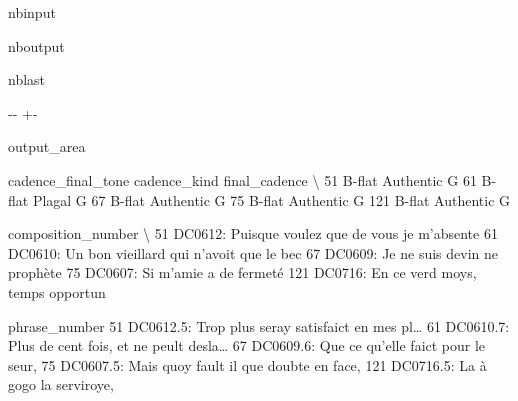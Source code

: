 \documentclass[letterpaper,10pt,english]{sphinxmanual}
\newlength\nbsphinxcodecellspacing
\begin{document}
\begin{sphinxuseclass}{nbinput}
{\begin{sphinxVerbatim}[commandchars=\\\{\}]

  \PYG{p}{[}\PYG{p}{]}


\end{sphinxVerbatim}
}

\end{sphinxuseclass}
\begin{sphinxuseclass}{nboutput}
\begin{sphinxuseclass}{nblast}
{

\kern-\sphinxverbatimsmallskipamount\kern-\baselineskip
\kern+\FrameHeightAdjust\kern-\fboxrule
\vspace{\nbsphinxcodecellspacing}

\begin{sphinxuseclass}{output_area}
\begin{sphinxuseclass}{}


\begin{sphinxVerbatim}[commandchars=\\\{\}]
\llap{\color{nbsphinxout}[31]:\,\hspace{\fboxrule}\hspace{\fboxsep}}    cadence\_final\_tone cadence\_kind final\_cadence  \textbackslash{}
51              B-flat    Authentic             G
61              B-flat       Plagal             G
67              B-flat    Authentic             G
75              B-flat    Authentic             G
121             B-flat    Authentic             G

                                  composition\_number  \textbackslash{}
51   DC0612: Puisque voulez que de vous je m'absente
61   DC0610: Un bon vieillard qui n'avoit que le bec
67              DC0609: Je ne suis devin ne prophète
75                    DC0607: Si m'amie a de fermeté
121          DC0716: En ce verd moys, temps opportun

                                         phrase\_number
51   DC0612.5: Trop plus seray satisfaict en mes pl{\ldots}
61   DC0610.7: Plus de cent fois, et ne peult desla{\ldots}
67        DC0609.6: Que ce qu'elle faict pour le seur,
75    DC0607.5: Mais quoy fault il que doubte en face,
121                  DC0716.5: La à gogo la serviroye,
\end{sphinxVerbatim}



\end{sphinxuseclass}
\end{sphinxuseclass}
}

\end{sphinxuseclass}
\end{sphinxuseclass}
\end{document}
